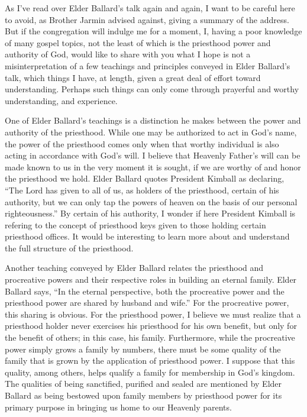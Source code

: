 \documentclass[12pt]{article}
\begin{document}
As I've read over Elder Ballard's talk again and again, I want to be careful here to
avoid, as Brother Jarmin advised against, giving a summary of the address.  But if the
congregation will indulge me for a moment, I, having a
poor knowledge of many gospel topics, not the least of which is the priesthood
power and authority of God, would like to share with you what I hope is not
a misinterpretation of a few teachings and principles conveyed in Elder Ballard's talk,
which things I have, at length, given a great deal of effort toward understanding.
Perhaps such things can only come through prayerful and worthy understanding,
and experience.

One of Elder Ballard's teachings is a distinction he makes between the power and
authority of the priesthood.  While one may be authorized to act in God's name,
the power of the priesthood comes only when that worthy individual is also acting in
accordance with God's will.  I believe that Heavenly Father's will can be made known
to us in the very moment it is sought, if we are worthy of and honor the priesthood we hold.
Elder Ballard quotes President Kimball as declaring, ``The Lord has given to all of us, as holders of
the priesthood, certain of his authority, but we can only tap the powers of heaven on the basis
of our personal righteousness.''  By certain of his authority, I wonder if here President Kimball
is refering to the concept of priesthood keys given to those holding certain priesthood offices.
It would be interesting to learn more about and understand the full structure of the priesthood.

Another teaching conveyed by Elder Ballard relates the priesthood and procreative powers
and their respective roles in building an eternal family.  Elder Ballard says, ``In the
eternal perspective, both the procreative power and the priesthood power are shared by husband
and wife.''  
For the procreative power, this sharing is obvious.  For the priesthood power, I believe
we must realize that a priesthood holder never exercises his priesthood for his own benefit,
but only for the benefit of others; in this case, his family.  Furthermore, while the procreative
power simply grows a family by numbers, there must be some quality of the family that is grown
by the application of priesthood power.  I suppose that this quality, among others, helps qualify a family
for membership in God's kingdom.  The qualities of being sanctified, purified and sealed
are mentioned by Elder Ballard as being bestowed upon family members by priesthood power for
its primary purpose in bringing us home to our Heavenly parents.

\end{document}
